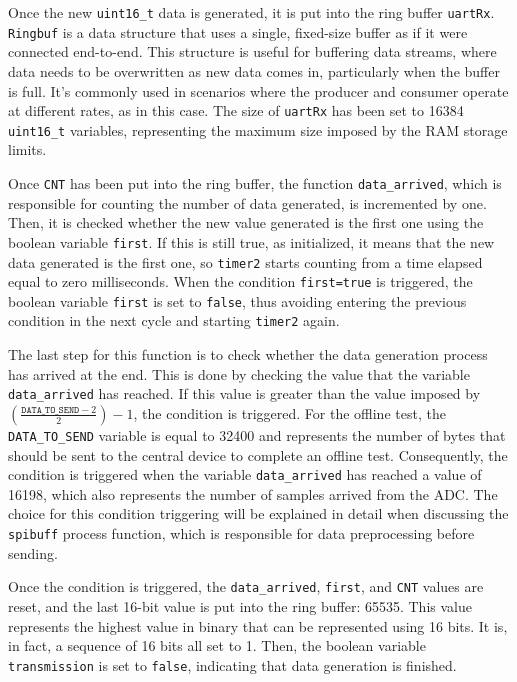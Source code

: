 \documentclass{Configuration_Files/PoliMi3i_thesis}
\begin{document}
Once the new \texttt{uint16\_t} data is generated, it is put into the ring buffer \texttt{uartRx}. \texttt{Ringbuf} is a data structure that uses a single, fixed-size buffer as if it were connected end-to-end. This structure is useful for buffering data streams, where data needs to be overwritten as new data comes in, particularly when the buffer is full. It's commonly used in scenarios where the producer and consumer operate at different rates, as in this case. The size of \texttt{uartRx} has been set to 16384 \texttt{uint16\_t} variables, representing the maximum size imposed by the RAM storage limits.

Once \texttt{CNT} has been put into the ring buffer, the function \texttt{data\_arrived}, which is responsible for counting the number of data generated, is incremented by one. Then, it is checked whether the new value generated is the first one using the boolean variable \texttt{first}. If this is still true, as initialized, it means that the new data generated is the first one, so \texttt{timer2} starts counting from a time elapsed equal to zero milliseconds. When the condition \texttt{first=true} is triggered, the boolean variable \texttt{first} is set to \texttt{false}, thus avoiding entering the previous condition in the next cycle and starting \texttt{timer2} again.

The last step for this function is to check whether the data generation process has arrived at the end. This is done by checking the value that the variable \texttt{data\_arrived} has reached. If this value is greater than the value imposed by \(\left(\frac{\texttt{DATA\_TO\_SEND} - 2}{2}\right) - 1\), the condition is triggered. For the offline test, the \texttt{DATA\_TO\_SEND} variable is equal to 32400 and represents the number of bytes that should be sent to the central device to complete an offline test. Consequently, the condition is triggered when the variable \texttt{data\_arrived} has reached a value of 16198, which also represents the number of samples arrived from the ADC. The choice for this condition triggering will be explained in detail when discussing the \texttt{spibuff} process function, which is responsible for data preprocessing before sending.

Once the condition is triggered, the \texttt{data\_arrived}, \texttt{first}, and \texttt{CNT} values are reset, and the last 16-bit value is put into the ring buffer: 65535. This value represents the highest value in binary that can be represented using 16 bits. It is, in fact, a sequence of 16 bits all set to 1. Then, the boolean variable \texttt{transmission} is set to \texttt{false}, indicating that data generation is finished.
\end{document}
